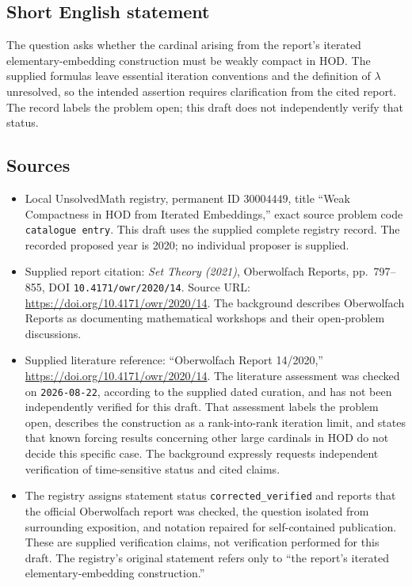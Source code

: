 \documentclass[11pt]{article}
\begin{document}
\subsection{Short English statement}
The question asks whether the cardinal arising from the report's iterated elementary-embedding construction must be weakly compact in \(\mathrm{HOD}\). The supplied formulas leave essential iteration conventions and the definition of \(\lambda\) unresolved, so the intended assertion requires clarification from the cited report. The record labels the problem open; this draft does not independently verify that status.
\subsection{Sources}
\begin{itemize}
\item Local UnsolvedMath registry, permanent ID \(30004449\), title ``Weak Compactness in HOD from Iterated Embeddings,'' exact source problem code \texttt{catalogue entry}. This draft uses the supplied complete registry record. The recorded proposed year is 2020; no individual proposer is supplied.
\item Supplied report citation: \emph{Set Theory (2021)}, Oberwolfach Reports, pp.~797--855, DOI \texttt{10.4171/owr/2020/14}. Source URL: \url{https://doi.org/10.4171/owr/2020/14}. The background describes Oberwolfach Reports as documenting mathematical workshops and their open-problem discussions.
\item Supplied literature reference: ``Oberwolfach Report 14/2020,'' \url{https://doi.org/10.4171/owr/2020/14}. The literature assessment was checked on \texttt{2026-08-22}, according to the supplied dated curation, and has not been independently verified for this draft. That assessment labels the problem open, describes the construction as a rank-into-rank iteration limit, and states that known forcing results concerning other large cardinals in HOD do not decide this specific case. The background expressly requests independent verification of time-sensitive status and cited claims.
\item The registry assigns statement status \texttt{corrected\_verified} and reports that the official Oberwolfach report was checked, the question isolated from surrounding exposition, and notation repaired for self-contained publication. These are supplied verification claims, not verification performed for this draft. The registry's original statement refers only to ``the report's iterated elementary-embedding construction.''
\end{itemize}
\end{document}
